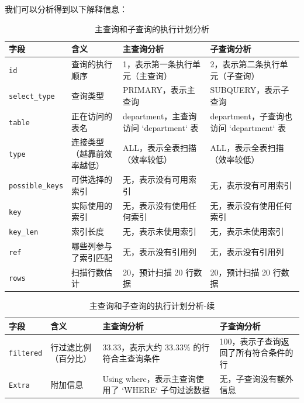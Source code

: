 \documentclass{article}
\begin{document}
	我们可以分析得到以下解释信息：
	
	\begin{table}[H]
		\centering
		\begin{tabular}{|l|l|p{4.8cm}|p{4.8cm}|}
			\hline
			\textbf{字段} & \textbf{含义} & \textbf{主查询分析} & \textbf{子查询分析} \\
			\hline
			\texttt{id} & 查询的执行顺序 & 1，表示第一条执行单元（主查询） & 2，表示第二条执行单元（子查询） \\
			\hline
			\texttt{select\_type} & 查询类型 & PRIMARY，表示主查询 & SUBQUERY，表示子查询 \\
			\hline
			\texttt{table} & 正在访问的表名 & department，主查询访问 `department` 表 & department，子查询也访问 `department` 表 \\
			\hline
			\texttt{type} & 连接类型（越靠前效率越低） & ALL，表示全表扫描（效率较低） & ALL，表示全表扫描（效率较低） \\
			\hline
			\texttt{possible\_keys} & 可供选择的索引 & 无，表示没有可用索引 & 无，表示没有可用索引 \\
			\hline
			\texttt{key} & 实际使用的索引 & 无，表示没有使用任何索引 & 无，表示没有使用任何索引 \\
			\hline
			\texttt{key\_len} & 索引长度 & 无，表示未使用索引 & 无，表示未使用索引 \\
			\hline
			\texttt{ref} & 哪些列参与了索引匹配 & 无，表示没有引用列 & 无，表示没有引用列 \\
			\hline
			\texttt{rows} & 扫描行数估计 & 20，预计扫描 20 行数据 & 20，预计扫描 20 行数据 \\
			\hline
		\end{tabular}
		\caption{主查询和子查询的执行计划分析}
	\end{table}
	
	\begin{table}[H]
		\centering
		\begin{tabular}{|l|l|p{4.8cm}|p{4.8cm}|}
			\hline
			\textbf{字段} & \textbf{含义} & \textbf{主查询分析} & \textbf{子查询分析} \\
			\hline
			\texttt{filtered} & 行过滤比例（百分比） & 33.33，表示大约 33.33\% 的行符合主查询条件 & 100，表示子查询返回了所有符合条件的行 \\
			\hline
			\texttt{Extra} & 附加信息 & Using where，表示主查询使用了 `WHERE` 子句过滤数据 & 无，子查询没有额外信息 \\
			\hline
		\end{tabular}
		\caption{主查询和子查询的执行计划分析-续}
	\end{table}
	
\end{document}
